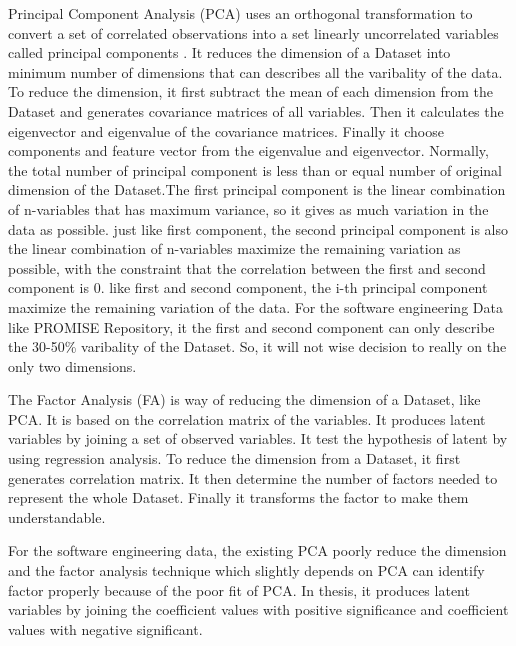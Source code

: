 \documentclass[12pt]{report}
\begin{document}
Principal Component Analysis (PCA) uses an orthogonal transformation to convert a set of correlated observations into a set linearly uncorrelated variables called principal components \cite{abdi2010principal,wold1987principal,jolliffe2002principal}. It reduces the dimension of a Dataset into minimum number of dimensions that can describes all the varibality of the data. To reduce the dimension, it first subtract the mean of each dimension from the Dataset and generates covariance matrices of all variables. Then it calculates the eigenvector and eigenvalue of the covariance matrices. Finally it choose components and feature vector from the eigenvalue and eigenvector. Normally, the total number of principal component is less than or equal number of original dimension of the Dataset.The first principal component is the linear combination of n-variables that has maximum variance, so it gives as much variation in the data as possible. just like first component, the second principal component is also the linear combination of n-variables maximize the remaining variation as possible, with the constraint that the correlation between the first and second component is $0$. like first and second component, the i-th principal component maximize the remaining variation of the data. For the software engineering Data like PROMISE Repository, it the first and second component can only describe the 30-50\% varibality of the Dataset. So, it will not wise decision to really on the only two dimensions.



The Factor Analysis (FA) is way of reducing the dimension of a Dataset, like PCA. It is based on the correlation matrix of the variables. It produces latent variables by joining a set of observed variables. It test the hypothesis of latent by using regression analysis. To reduce the dimension from a Dataset, it first generates correlation matrix. It then determine the number of factors needed to represent the whole Dataset. Finally it transforms the factor to make them understandable.


For the software engineering data, the existing PCA poorly reduce the dimension and the factor analysis technique which slightly depends on PCA can identify factor properly because of the poor fit of PCA. In thesis, it produces latent variables by joining the coefficient values with positive significance and coefficient values with negative significant. 
\end{document}
